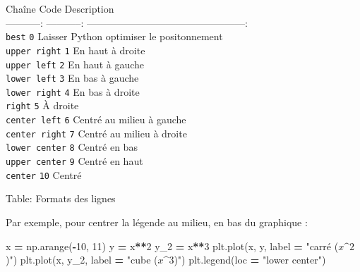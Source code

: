 \documentclass[
  12pt,
]{book}
\newenvironment{Shaded}{\begin{snugshade}}{\end{snugshade}}
\newcommand{\DecValTok}[1]{\textcolor[rgb]{0.00,0.00,0.81}{#1}}
\newcommand{\NormalTok}[1]{#1}
\newcommand{\OperatorTok}[1]{\textcolor[rgb]{0.81,0.36,0.00}{\textbf{#1}}}
\newcommand{\StringTok}[1]{\textcolor[rgb]{0.31,0.60,0.02}{#1}}
\numberwithin{equation}{section}
\numberwithin{countremarque}{section}
\begin{document}
Chaîne \textbar{} Code \textbar{} Description \textbar{}\\
-----------: \textbar{} \textbar{} -----------: \textbar{} ------------------------------------------------:\textbar{}\\
\texttt{best} \textbar{} \texttt{0} \textbar{} Laisser Python optimiser le positonnement \textbar{}\\
\texttt{upper\ right} \textbar{} \texttt{1} \textbar{} En haut à droite \textbar{}\\
\texttt{upper\ left} \textbar{} \texttt{2} \textbar{} En haut à gauche \textbar{}\\
\texttt{lower\ left} \textbar{} \texttt{3} \textbar{} En bas à gauche \textbar{}\\
\texttt{lower\ right} \textbar{} \texttt{4} \textbar{} En bas à droite \textbar{}\\
\texttt{right} \textbar{} \texttt{5} \textbar{} À droite \textbar{}\\
\texttt{center\ left} \textbar{} \texttt{6} \textbar{} Centré au milieu à gauche \textbar{}\\
\texttt{center\ right} \textbar{} \texttt{7} \textbar{} Centré au milieu à droite \textbar{}\\
\texttt{lower\ center} \textbar{} \texttt{8} \textbar{} Centré en bas \textbar{}\\
\texttt{upper\ center} \textbar{} \texttt{9} \textbar{} Centré en haut \textbar{}\\
\texttt{center} \textbar{} \texttt{10} \textbar{} Centré \textbar{}

Table: \label{tab:pyplot-legendes-loc} Formats des lignes

Par exemple, pour centrer la légende au milieu, en bas du graphique :

\begin{Shaded}
\begin{Highlighting}[]
\NormalTok{x }\OperatorTok{=}\NormalTok{ np.arange(}\OperatorTok{{-}}\DecValTok{10}\NormalTok{, }\DecValTok{11}\NormalTok{)}
\NormalTok{y }\OperatorTok{=}\NormalTok{ x}\OperatorTok{**}\DecValTok{2}
\NormalTok{y\_2 }\OperatorTok{=}\NormalTok{ x}\OperatorTok{**}\DecValTok{3}
\NormalTok{plt.plot(x, y, label }\OperatorTok{=} \StringTok{"carré ($x\^{}2$)"}\NormalTok{)}
\NormalTok{plt.plot(x, y\_2, label }\OperatorTok{=} \StringTok{"cube ($x\^{}3$)"}\NormalTok{)}
\NormalTok{plt.legend(loc }\OperatorTok{=} \StringTok{"lower center"}\NormalTok{)}
\end{Highlighting}
\end{Shaded}
\end{document}
